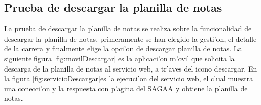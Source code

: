 



\subsection{Prueba de descargar la planilla de notas}
La prueba de descargar la planilla de notas se realiza sobre la funcionalidad de descargar la planilla de notas, primeramente se han elegido la gesti'on, el detalle de la carrera y finalmente elige la opci'on  de descargar planilla de notas. La siguiente figura \ref{fig:movilDescargar} es la aplicaci'on m'ovil que solicita la descarga de la planilla de notas al servicio web, a tr'aves del icono descargar. En la figura \ref{fig:servicioDescargar}es la ejecuci'on del servicio web, el c'ual muestra una conecci'on y la respuesta con  p'agina del SAGAA y obtiene la planilla de notas. 

